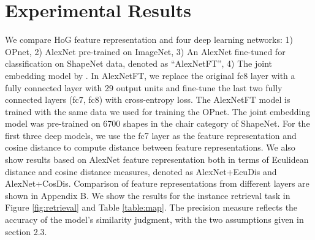 \documentclass{article} %
\begin{document}



\section{Experimental Results}
We compare HoG feature representation \citep{dalal2005histograms} and four deep  learning networks: 1) OPnet,  2)  AlexNet pre-trained on ImageNet, 3) An AlexNet fine-tuned for classification on ShapeNet data, denoted as ``AlexNetFT'', 4) The joint embedding model by \cite{li2015jointembedding}. 
In AlexNetFT, we replace the original fc8 layer with a fully connected layer with 29 output units and fine-tune the last two fully connected layers (fc7, fc8) with cross-entropy loss. The AlexNetFT model is trained with the same data we used for training the OPnet. The joint embedding model was
 pre-trained on 6700 shapes in the chair category of ShapeNet. For the first three deep models, we use the fc7 layer as the feature representation and cosine distance to compute distance between feature representations. We also show results based on AlexNet feature representation both in terms of Eculidean distance and cosine distance measures, denoted as AlexNet+EcuDis and AlexNet+CosDis. Comparison of feature representations from different layers are shown in Appendix B.
We show the results for the instance retrieval task in Figure \ref{fig:retrieval} and Table \ref{table:map}. The precision measure reflects the accuracy of the model's similarity judgment, with the two assumptions given in section 2.3.
\end{document}
